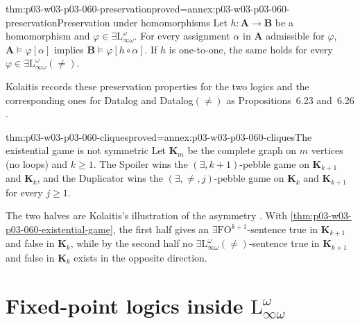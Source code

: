 \begin{hbcorollary}{thm:p03-w03-p03-060-preservation}{proved=annex:p03-w03-p03-060-preservation}{Preservation under homomorphisms}
Let \(h\colon\mathbf A\to\mathbf B\) be a homomorphism and
\(\varphi\in\exists\mathrm{L}^\omega_{\infty\omega}\). For every assignment
\(\alpha\) in \(\mathbf A\) admissible for \(\varphi\),
\(\mathbf A\models\varphi[\alpha]\) implies
\(\mathbf B\models\varphi[h\circ\alpha]\). If \(h\) is one-to-one, the same
holds for every \(\varphi\in\exists\mathrm{L}^\omega_{\infty\omega}(\neq)\).
\end{hbcorollary}

Kolaitis records these preservation properties for the two logics
\cite[p.~71]{Kolaitis2003ExpressivePowerNotes} and the corresponding
ones for Datalog and Datalog\((\neq)\) as Propositions~6.23 and~6.26
\cite[pp.~44--45]{Kolaitis2003ExpressivePowerNotes}.

\begin{hbtheorem}{thm:p03-w03-p03-060-cliques}{proved=annex:p03-w03-p03-060-cliques}{The existential game is not symmetric}
Let \(\mathbf K_m\) be the complete graph on \(m\) vertices (no loops) and
\(k\ge1\). The Spoiler wins the \((\exists,k+1)\)-pebble game on
\(\mathbf K_{k+1}\) and \(\mathbf K_k\), and the Duplicator wins the
\((\exists,\neq,j)\)-pebble game on \(\mathbf K_k\) and \(\mathbf K_{k+1}\)
for every \(j\ge1\).
\end{hbtheorem}

The two halves are Kolaitis's illustration of the asymmetry
\cite[p.~72]{Kolaitis2003ExpressivePowerNotes}. With
\cref{thm:p03-w03-p03-060-existential-game}, the first half gives an
\(\exists\mathrm{FO}^{k+1}\)-sentence true in \(\mathbf K_{k+1}\) and false
in \(\mathbf K_k\), while by the second half no
\(\exists\mathrm{L}^\omega_{\infty\omega}(\neq)\)-sentence true in
\(\mathbf K_{k+1}\) and false in \(\mathbf K_k\) exists in the opposite
direction.

\section{Fixed-point logics inside \(\mathrm{L}^\omega_{\infty\omega}\)}
\label{sec:p03-w03-p03-060-fp}

